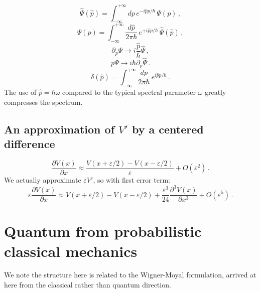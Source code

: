 \documentclass[prb,preprint]{revtex4-1}
\begin{document}
\begin{equation}\label{eq:fourier-forward}
\hat{\Psi}(\hat{p}) = \int_{-\infty}^{+\infty} dp \, e^{-i\hat{p}p/\hbar}\,\Psi(p) \,,
\end{equation}
\begin{equation}\label{eq:fourier-inverse}
\Psi(p) = \int_{-\infty}^{+\infty} \frac{d\hat{p}}{2\pi \hbar} \, e^{+i\hat{p}p/\hbar}\,\hat{\Psi}(\hat{p}) \,,
\end{equation}
\begin{equation}
\partial_p \Psi \rightarrow i \frac{\hat{p}}{\hbar} \hat{\Psi} \,,
\end{equation}
\begin{equation}
p\Psi \rightarrow i \hbar \partial_{\hat{p}} \hat{\Psi} \,.
\end{equation}
\begin{equation}\label{eq:delta}
\delta(\hat{p})= \int_{-\infty}^{+\infty} \frac{dp}{2\pi \hbar} \, e^{i\hat{p}p/\hbar} \,.
\end{equation}
The use of $\hat{p} = \hbar \omega$ compared to the typical spectral parameter $\omega$ greatly
compresses the spectrum.

\subsection{An approximation of $V'$ by a centered difference}

\begin{equation}\label{eq:centered-diff}
\frac{\partial V(x)}{\partial x} \approx \frac{V(x+\varepsilon/2) - V(x-\varepsilon/2)}{\varepsilon}
+ O(\varepsilon^2)  \,.
\end{equation}
We actually approximate $\varepsilon V'$, so with first error term:
\begin{equation}\label{eq:centered-diff-error}
\varepsilon \frac{\partial V(x)}{\partial x} \approx V(x+\varepsilon/2) - V(x-\varepsilon/2)
+ \frac{\varepsilon^3}{24} \frac{\partial^3 V(x)}{\partial x^3} + O(\varepsilon^5)  \,.
\end{equation}


\section{Quantum from probabilistic classical mechanics}

We note the structure here is related to the Wigner-Moyal formulation,\cite{wigner1932,moyal1949,hillery1984}
arrived at here from the classical rather than quantum direction.
\end{document}
